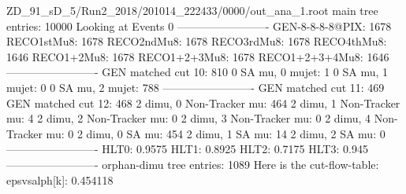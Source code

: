 ZD_91_sD_5/Run2_2018/201014_222433/0000/out_ana_1.root
main tree entries: 10000
Looking at Events 0
-------------------------
GEN-8-8-8-8@PIX: 1678
RECO1stMu8: 1678
RECO2ndMu8: 1678
RECO3rdMu8: 1678
RECO4thMu8: 1646
RECO1+2Mu8: 1678
RECO1+2+3Mu8: 1678
RECO1+2+3+4Mu8: 1646
-------------------------
GEN matched cut 10: 810
0 SA mu, 0 mujet: 1
0 SA mu, 1 mujet: 0
0 SA mu, 2 mujet: 788
-------------------------
GEN matched cut 11: 469
GEN matched cut 12: 468
2 dimu, 0 Non-Tracker mu: 464
2 dimu, 1 Non-Tracker mu: 4
2 dimu, 2 Non-Tracker mu: 0
2 dimu, 3 Non-Tracker mu: 0
2 dimu, 4 Non-Tracker mu: 0
2 dimu, 0 SA mu: 454
2 dimu, 1 SA mu: 14
2 dimu, 2 SA mu: 0
-------------------------
HLT0: 0.9575
HLT1: 0.8925
HLT2: 0.7175
HLT3: 0.945
-------------------------
orphan-dimu tree entries: 1089
Here is the cut-flow-table:
epsvsalph[k]: 0.454118
        
